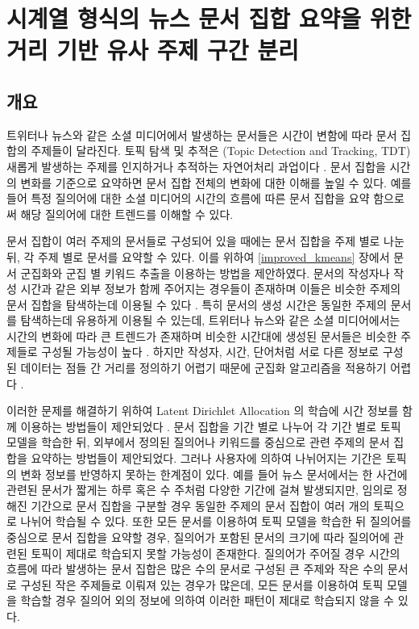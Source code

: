 \documentclass[oneside, ko,phd]{snuthesis_utf8_kor}
\begin{document}
\newpage
\chapter{시계열 형식의 뉴스 문서 집합 요약을 위한 거리 기반 유사 주제 구간 분리} \label{timeseries_summarization}

\section{개요}

트위터나 뉴스와 같은 소셜 미디어에서 발생하는 문서들은 시간이 변함에 따라 문서 집합의 주제들이 달라진다.
토픽 탐색 및 추적은 (Topic Detection and Tracking, TDT) 새롭게 발생하는 주제를 인지하거나 추적하는 자연어처리 과업이다 \cite{fiscus2002topic}.
문서 집합을 시간의 변화를 기준으로 요약하면 문서 집합 전체의 변화에 대한 이해를 높일 수 있다.
예를 들어 특정 질의어에 대한 소셜 미디어의 시간의 흐름에 따른 문서 집합을 요약 함으로써 해당 질의어에 대한 트렌드를 이해할 수 있다.

문서 집합이 여러 주제의 문서들로 구성되어 있을 때에는 문서 집합을 주제 별로 나눈 뒤, 각 주제 별로 문서를 요약할 수 있다.
이를 위하여 \ref{improved_kmeans} 장에서 문서 군집화와 군집 별 키워드 추출을 이용하는 방법을 제안하였다.
문서의 작성자나 작성 시간과 같은 외부 정보가 함께 주어지는 경우들이 존재하며 이들은 비슷한 주제의 문서 집합을 탐색하는데 이용될 수 있다 \cite{liu2009topic, balasubramanyan2011block}.
특히 문서의 생성 시간은 동일한 주제의 문서를 탐색하는데 유용하게 이용될 수 있는데, 트위터나 뉴스와 같은 소셜 미디어에서는 시간의 변화에 따라 큰 트렌드가 존재하며 \cite{diao2012finding} 비슷한 시간대에 생성된 문서들은 비슷한 주제들로 구성될 가능성이 높다 \cite{blei2006dynamic, alsumait2008line}.
하지만 작성자, 시간, 단어처럼 서로 다른 정보로 구성된 데이터는 점들 간 거리를 정의하기 어렵기 때문에 군집화 알고리즘을 적용하기 어렵다 \cite{hennig2013find, browne2012model}.

이러한 문제를 해결하기 위하여 Latent Dirichlet Allocation \cite{blei2003latent} 의 학습에 시간 정보를 함께 이용하는 방법들이 제안되었다 \cite{blei2006dynamic, wang2006topics, huang2017probabilistic}.
문서 집합을 기간 별로 나누어 각 기간 별로 토픽 모델을 학습한 뒤, 외부에서 정의된 질의어나 키워드를 중심으로 관련 주제의 문서 집합을 요약하는 방법들이 제안되었다.
그러나 사용자에 의하여 나뉘어지는 기간은 토픽의 변화 정보를 반영하지 못하는 한계점이 있다.
예를 들어 뉴스 문서에서는 한 사건에 관련된 문서가 짧게는 하루 혹은 수 주처럼 다양한 기간에 걸쳐 발생되지만, 임의로 정해진 기간으로 문서 집합을 구분할 경우 동일한 주제의 문서 집합이 여러 개의 토픽으로 나뉘어 학습될 수 있다.
또한 모든 문서를 이용하여 토픽 모델을 학습한 뒤 질의어를 중심으로 문서 집합을 요약할 경우, 질의어가 포함된 문서의 크기에 따라 질의어에 관련된 토픽이 제대로 학습되지 못할 가능성이 존재한다.
질의어가 주어질 경우 시간의 흐름에 따라 발생하는 문서 집합은 많은 수의 문서로 구성된 큰 주제와 작은 수의 문서로 구성된 작은 주제들로 이뤄져 있는 경우가 많은데, 모든 문서를 이용하여 토픽 모델을 학습할 경우 질의어 외의 정보에 의하여 이러한 패턴이 제대로 학습되지 않을 수 있다.
\end{document}
